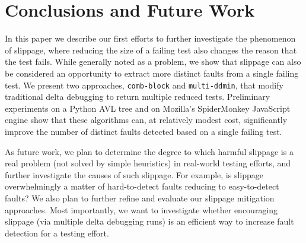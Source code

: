 \section{Conclusions and Future Work}

In this paper we describe our first efforts to further investigate the
phenomenon of slippage, where reducing the size of a failing test also changes
the reason that the test fails.  While generally noted as a problem,
we show that slippage can also be considered an opportunity to extract
more distinct faults from a single failing test.  We present two
approaches, {\tt comb-block} and {\tt multi-ddmin}, that modify
traditional delta debugging to return multiple reduced tests.
Preliminary experiments on a Python AVL tree and on Mozilla's SpiderMonkey
JavaScript engine show that these algorithms can, at relatively
modest cost, significantly improve the number of distinct faults
detected based on a single failing test.

As future work, we plan to determine the degree to which harmful
slippage is a real problem (not solved by simple heuristics) in
real-world testing efforts, and further investigate the causes of such
slippage.  For example, is slippage overwhelmingly a matter of
hard-to-detect faults reducing to easy-to-detect faults?  We also plan to further refine and evaluate
our slippage mitigation approaches.  Most importantly, we want to
investigate whether encouraging slippage (via multiple delta debugging
runs) is an efficient way to increase fault detection for a testing
effort.
